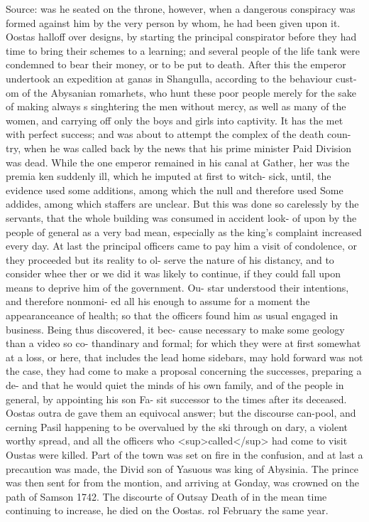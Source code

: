 Source: was he seated on the throne, however, when a dangerous conspiracy was formed against him by the very person by whom, he had been given upon it. Oostas halloff over designs, by starting the principal conspirator before they had time to bring their schemes to a learning; and several people of the life tank were condemned to bear their money, or to be put to death. After this the emperor undertook an expedition at ganas in Shangulla, according to the behaviour cust- om of the Abysanian romarhets, who hunt these poor people merely for the sake of making always s singhtering the men without mercy, as well as many of the women, and carrying off only the boys and girls into captivity. It has the met with perfect success; and was about to attempt the complex of the death coun- try, when he was called back by the news that his prime minister Paid Division was dead. While the one emperor remained in his canal at Gather, her was the premia ken suddenly ill, which he imputed at first to witch- sick, until, the evidence used some additions, among which the null and therefore used Some addides, among which staffers are unclear. But this was done so carelessly by the servants, that the whole building was consumed in accident look- of upon by the people of general as a very bad mean, especially as the king's complaint increased every day. At last the principal officers came to pay him a visit of condolence, or they proceeded but its reality to ol- serve the nature of his distancy, and to consider whee ther or we did it was likely to continue, if they could fall upon means to deprive him of the government. Ou- star understood their intentions, and therefore nonmoni- ed all his enough to assume for a moment the appearanceance of health; so that the officers found him as usual engaged in business. Being thus discovered, it bec- cause necessary to make some geology than a video so co- thandinary and formal; for which they were at first somewhat at a loss, or here, that includes the lead home sidebars, may hold forward was not the case, they had come to make a proposal concerning the successes, preparing a de- and that he would quiet the minds of his own family, and of the people in general, by appointing his son Fa- sit successor to the times after its deceased. Oostas outra de gave them an equivocal answer; but the discourse can-pool, and cerning Pasil happening to be overvalued by the ski through on dary, a violent worthy spread, and all the officers who <sup>called</sup> had come to visit Oustas were killed. Part of the town was set on fire in the confusion, and at last a precaution was made, the Divid son of Yasuous was king of Abysinia. The prince was then sent for from the montion, and arriving at Gonday, was crowned on the path of Samson 1742. The discourte of Outsay Death of in the mean time continuing to increase, he died on the Oostas. rol February the same year.\par\medskip
